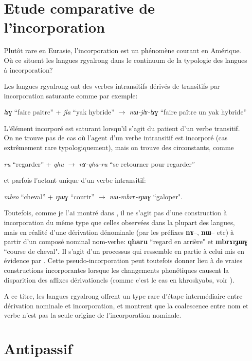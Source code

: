 \documentclass[oldfontcommands,oneside,a4paper,11pt]{memoir}
\newcommand{\ipa}[1]{{\phon\textbf{#1}}}
\begin{document}
\section{Etude comparative de l'incorporation} \label{sec:incorp}

 Plutôt rare en Eurasie, l'incorporation est un phénomène courant en Amérique. Où ce situent les langues rgyalrong dans le continuum de la typologie des langues à incorporation? 

Les langues rgyalrong ont des verbes intransitifs dérivés de transitifs par incorporation saturante comme par exemple:

\textit{lɤɣ} ``faire paitre'' + \textit{jla} ``yak hybride'' $\rightarrow $ \textit{nɯ-jlɤ-lɤɣ} ``faire paître un yak hybride''

L'élément incorporé est saturant lorsqu'il s'agit du patient d'un verbe transitif. On ne trouve pas de cas où l'agent d'un verbe intransitif est incorporé (cas extrêmement rare typologiquement), mais on trouve des circonstants, comme

\textit{ru} ``regarder'' + \textit{qhu} $\rightarrow $ \textit{nɤ-qha-ru} ``se retourner pour regarder''

et parfois l'actant unique d'un verbe intransitif:


\textit{mbro} ``cheval'' + \textit{rɟɯɣ} ``courir'' $\rightarrow $ \textit{nɯ-mbrɤ-rɟɯɣ} ``galoper".

Toutefois, comme je l'ai montré dans \citet{jacques12incorp}, il ne s'agit pas d'une construction à incorporation du même type que celles observées dans la plupart des langues, mais en réalité d'une dérivation dénominale (par les préfixes \ipa{nɤ}--, \ipa{nɯ}-- etc) à partir d'un composé nominal nom-verbe: \ipa{qharu} ``regard en arrière" et \ipa{mbrɤrɟɯɣ} ``course de cheval". Il s'agit d'un processus qui ressemble en partie à celui mis en évidence par \citet{benveniste66incorp}. Cette pseudo-incorporation peut toutefois donner lieu à de vraies constructions incorporantes lorsque les changements phonétiques causent la disparition des affixes dérivationels (comme c'est le cas en khroskyabs, voir \citealt{lai13affixale}).

A ce titre, les langues rgyalrong offrent un type rare d'étape intermédiaire entre dérivation nominale et incorporation, et montrent que la coalescence entre nom et verbe n'est pas la seule origine de l'incorporation nominale.

\section{Antipassif}
\end{document}

